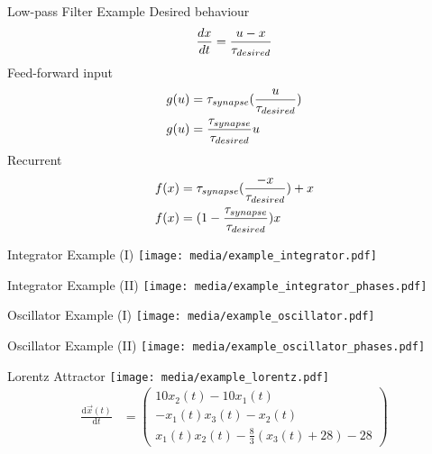 \documentclass[handout,aspectratio=169]{beamer}
\begin{document}
\begin{frame}{Low-pass Filter Example}
Desired behaviour
\begin{align*}
	{dx \over dt} = {{u - x} \over \tau_{desired}}	
\end{align*}
Feed-forward input
\begin{align*}
	g(u) &= \tau_{synapse} ({u \over \tau_{desired}}) \\
	g(u) &= {\tau_{synapse} \over \tau_{desired}} u	
\end{align*}
Recurrent
\begin{align*}
	f(x) &= \tau_{synapse} ({{-x} \over \tau_{desired}}) + x \\
	f(x) &= (1-{\tau_{synapse} \over \tau_{desired}})x			
\end{align*}	
\end{frame}	

	\begin{frame}{Integrator Example (I)}
		\centering
		\texttt{[image: media/example\_integrator.pdf]}
	\end{frame}

	\begin{frame}{Integrator Example (II)}
		\centering
		\texttt{[image: media/example\_integrator\_phases.pdf]}
	\end{frame}

	\begin{frame}{Oscillator Example (I)}
		\centering
		\texttt{[image: media/example\_oscillator.pdf]}
	\end{frame}

	\begin{frame}{Oscillator Example (II)}
		\centering
		\texttt{[image: media/example\_oscillator\_phases.pdf]}
	\end{frame}

	\begin{frame}{Lorentz Attractor}
		\centering
		\texttt{[image: media/example\_lorentz.pdf]}
		\begin{align*}
			\frac{\mathrm{d}\vec x(t)}{\mathrm{d}t} &= \begin{pmatrix}
			10 x_2(t)-10x_1(t) \\
			-x_1(t) x_3(t)-x_2(t) \\
			x_1(t) x_2(t) - \frac{8}{3}(x_3(t)+28)-28
			\end{pmatrix}
		\end{align*}
	\end{frame}
\end{document}
